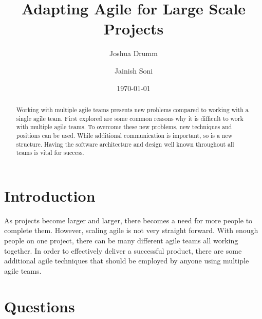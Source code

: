 \documentclass[sigplan,screen]{acmart}
\begin{document}
\title{Adapting Agile for Large Scale Projects}

\author{Joshua Drumm}

\author{Jainish Soni}

\date{\today}

\begin{abstract}
Working with multiple agile teams presents new problems compared to working with a single agile team. First explored are some common reasons why it is difficult to work with multiple agile teams. To overcome these new problems, new techniques and positions can be used. While additional communication is important, so is a new structure. Having the software architecture and design well known throughout all teams is vital for success.
\end{abstract}


\maketitle

\newpage
{}



\section{Introduction}
As projects become larger and larger, there becomes a need for more people to complete them. However, scaling agile is not very straight forward. With enough people on one project, there can be many different agile teams all working together. In order to effectively deliver a successful product, there are some additional agile techniques that should be employed by anyone using multiple agile teams.

\section{Questions}
\end{document}
